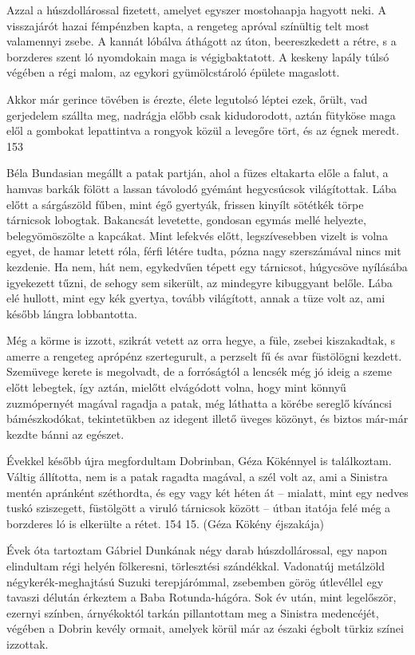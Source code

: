 \documentclass{IEEEtran}
\begin{document}
Azzal a húszdollárossal fizetett, amelyet egyszer mostohaapja hagyott neki. A
visszajárót hazai fémpénzben kapta, a rengeteg apróval színültig telt most
valamennyi zsebe. A kannát lóbálva áthágott az úton, beereszkedett a rétre, s
a borzderes szent ló nyomdokain maga is végigbaktatott. A keskeny lapály túlsó
végében a régi malom, az egykori gyümölcstároló épülete magaslott.

Akkor már gerince tövében is érezte, élete legutolsó léptei ezek, őrült, vad
gerjedelem szállta meg, nadrágja előbb csak kidudorodott, aztán fütyköse maga
elől a gombokat lepattintva a rongyok közül a levegőre tört, és az égnek
meredt.
153

Béla Bundasian megállt a patak partján, ahol a füzes eltakarta előle a falut,
a hamvas barkák fölött a lassan távolodó gyémánt hegycsúcsok világítottak.
Lába előtt a sárgászöld fűben, mint égő gyertyák, frissen kinyílt sötétkék
törpe tárnicsok lobogtak. Bakancsát levetette, gondosan egymás mellé helyezte,
belegyömöszölte a kapcákat. Mint lefekvés előtt, legszívesebben vizelt is
volna egyet, de hamar letett róla, férfi létére tudta, pózna nagy szerszámával
nincs mit kezdenie. Ha nem, hát nem, egykedvűen tépett egy tárnicsot,
húgycsöve nyílásába igyekezett tűzni, de sehogy sem sikerült, az mindegyre
kibuggyant belőle. Lába elé hullott, mint egy kék gyertya, tovább világított,
annak a tüze volt az, ami később lángra lobbantotta.

Még a körme is izzott, szikrát vetett az orra hegye, a füle, zsebei
kiszakadtak, s amerre a rengeteg aprópénz szertegurult, a perzselt fű és avar
füstölögni kezdett. Szemüvege kerete is megolvadt, de a forróságtól a lencsék
még jó ideig a szeme előtt lebegtek, így aztán, mielőtt elvágódott volna, hogy
mint könnyű zuzmópernyét magával ragadja a patak, még láthatta a körébe
sereglő kíváncsi bámészkodókat, tekintetükben az idegent illető üveges
közönyt, és biztos már-már kezdte bánni az egészet.

Évekkel később újra megfordultam Dobrinban, Géza Kökénnyel is találkoztam.
Váltig állította, nem is a patak ragadta magával, a szél volt az, ami a
Sinistra mentén apránként széthordta, és egy vagy két héten át – mialatt, mint
egy nedves tuskó sziszegett, füstölgött a viruló tárnicsok között – útban
itatója felé még a borzderes ló is elkerülte a rétet.
154
15. (Géza Kökény éjszakája)

Évek óta tartoztam Gábriel Dunkának négy darab húszdollárossal, egy napon
elindultam régi helyén fölkeresni, törlesztési szándékkal. Vadonatúj metálzöld
négykerék-meghajtású Suzuki terepjárómmal, zsebemben görög útlevéllel egy
tavaszi délután érkeztem a Baba Rotunda-hágóra. Sok év után, mint legelőször,
ezernyi színben, árnyékoktól tarkán pillantottam meg a Sinistra medencéjét,
végében a Dobrin kevély ormait, amelyek körül már az északi égbolt türkiz
színei izzottak.
\end{document}
